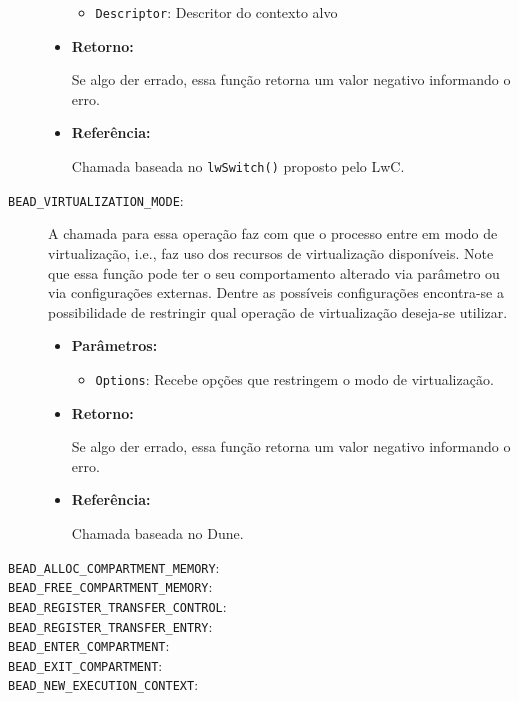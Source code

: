 \begin{description}
\begin{itemize}
    \begin{itemize}
      \item \texttt{Descriptor}: Descritor do contexto alvo
    \end{itemize}

    \item \textbf{Retorno:}

Se algo der errado, essa função retorna um valor negativo informando o erro.

    \item \textbf{Referência:}

Chamada baseada no \texttt{lwSwitch()} proposto pelo LwC.

  \end{itemize}

  \item [\texttt{BEAD\_VIRTUALIZATION\_MODE}:]

A chamada para essa operação faz com que o processo entre em modo de
virtualização, i.e., faz uso dos recursos de virtualização disponíveis. Note
que essa função pode ter o seu comportamento alterado via parâmetro ou via
configurações externas. Dentre as possíveis configurações encontra-se a
possibilidade de restringir qual operação de virtualização deseja-se utilizar.

  \begin{itemize}
    \item \textbf{Parâmetros:}

    \begin{itemize}
      \item \texttt{Options}: Recebe opções que restringem o modo de virtualização.
    \end{itemize}

    \item \textbf{Retorno:}

Se algo der errado, essa função retorna um valor negativo informando o erro.

    \item \textbf{Referência:}

Chamada baseada no Dune.

  \end{itemize}

  \item [\texttt{BEAD\_ALLOC\_COMPARTMENT\_MEMORY}:]
  \item [\texttt{BEAD\_FREE\_COMPARTMENT\_MEMORY}:]
  \item [\texttt{BEAD\_REGISTER\_TRANSFER\_CONTROL}:]
  \item [\texttt{BEAD\_REGISTER\_TRANSFER\_ENTRY}:]
  \item [\texttt{BEAD\_ENTER\_COMPARTMENT}:]
  \item [\texttt{BEAD\_EXIT\_COMPARTMENT}:]
  \item [\texttt{BEAD\_NEW\_EXECUTION\_CONTEXT}:]
\end{description}

